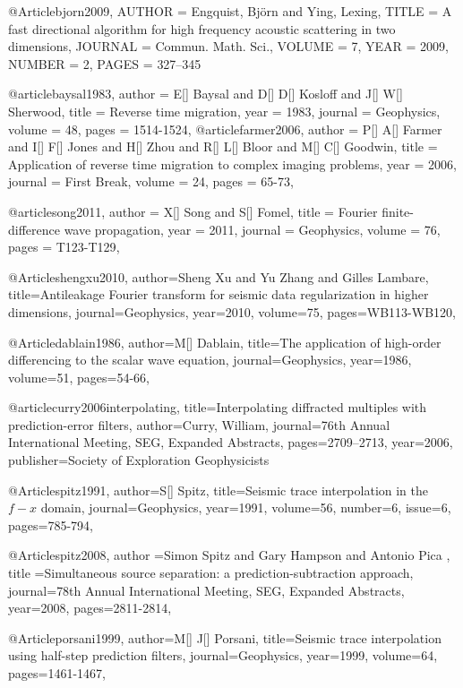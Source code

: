 @Article{bjorn2009,
   AUTHOR = {Engquist, Bj{\"o}rn and Ying, Lexing},
   TITLE = {A fast directional algorithm for high frequency acoustic 
            scattering in two dimensions},
   JOURNAL = {Commun. Math. Sci.}, 
   VOLUME = {7}, 
   YEAR = {2009}, 
   NUMBER = {2},
   PAGES = {327--345} 
}

@article{baysal1983,
  author =	 {E[] Baysal and D[] D[] Kosloff and J[] W[] Sherwood},
  title =	 {Reverse time migration},
  year =	 1983,
  journal =	 {Geophysics},
  volume =	 48,
  pages =	 {1514-1524},
}
@article{farmer2006,
  author =	 {P[] A[] Farmer and I[] F[] Jones and H[] Zhou and R[] L[] Bloor and M[] C[] Goodwin},
  title =	 {Application of reverse time migration to complex imaging problems},
  year =	 2006,
  journal =	 {First Break},
  volume =	 24,
  pages =	 {65-73},
}

@article{song2011,
  author =	 {X[] Song and S[] Fomel},
  title =	 {{F}ourier finite-difference wave propagation},
  year =	 2011,
  journal =	 {Geophysics},
  volume =	 76,
  pages =	 {T123-T129},
}

@Article{shengxu2010,
  author={Sheng Xu and Yu Zhang and Gilles Lambare},
  title={Antileakage {F}ourier transform for seismic data regularization in higher dimensions},
  journal={Geophysics},
  year=2010,
  volume=75,
  pages={WB113-WB120},
}

@Article{dablain1986,
  author={M[] Dablain},
  title={The application of high-order differencing to the scalar wave equation},
  journal={Geophysics},
  year=1986,
  volume=51,
  pages={54-66},
}

@article{curry2006interpolating,
  title={Interpolating diffracted multiples with prediction-error filters},
  author={Curry, William},
  journal={76th Annual International Meeting, SEG, Expanded Abstracts},
  pages={2709--2713},
  year={2006},
  publisher={Society of Exploration Geophysicists}
}

@Article{spitz1991,
  author={S[] Spitz},
  title={Seismic trace interpolation in the $f-x$ domain},
  journal={Geophysics},
  year=1991,
  volume=56,
  number=6,
  issue=6,
  pages={785-794},
}

@Article{spitz2008,
  author ={Simon Spitz and Gary Hampson and Antonio Pica },
  title ={Simultaneous source separation: a prediction-subtraction approach},
  journal={78th Annual International Meeting, SEG, Expanded Abstracts},
  year=2008,
  pages={2811-2814},
}

@Article{porsani1999,
  author={M[] J[] Porsani},
  title={Seismic trace interpolation using half-step prediction filters},
  journal={Geophysics},
  year=1999,
  volume=64,
  pages={1461-1467},
}

